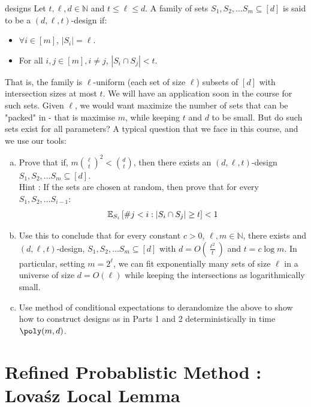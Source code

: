 \begin{exercise-prob}
\begin{show-ps2}{designs}
Let $t,\ell, d \in \mathbb{N}$ and $t \le \ell \le d$. 
A family of sets $S_1, S_2, \ldots S_m \subseteq [d]$ is said to be a $(d,\ell, t)$-design if: 
\begin{itemize}
\itemsep 0pt
\item $\forall i \in [m]$, $|S_i| = \ell$.
\item For all $i,j \in [m], i \ne j$, $|S_i \cap S_j| < t$.
\end{itemize}
That is, the family is $\ell$-uniform (each set of size $\ell$) subsets of $[d]$ with intersection sizes at most $t$. We will have an application soon in the course for such sets. Given $\ell$, we would want maximize the number of sets that can be "packed" in - that is maximise $m$, while keeping $t$ and $d$ to be small. But do such sets exist for all parameters? A typical question that we face in this course, and we use our tools:
\begin{enumerate}[(a)]
\item Prove that if, $m {\ell \choose t}^2 < {d \choose t}$, then there exists an $(d,\ell,t)$-design $S_1, S_2, \ldots S_m \subseteq [d]$. \\
Hint : If the sets are chosen at random, then prove that for every $S_1, S_2, \ldots S_{i-1}$:
$${\mathbb E}_{S_i}\left[\# j < i : |S_i \cap S_j| \ge t \right] < 1$$
\item Use this to conclude that for every constant $c > 0$, $\ell, m \in \mathbb{N}$, there exists and $(d,\ell,t)$-design, $S_1, S_2, \ldots S_m \subseteq [d]$ with $d = O\left( \frac{\ell^2}{t} \right)$ and $t = c\log m$. In particular, setting $m = 2^\ell$, we can fit exponentially many sets of size $\ell$ in a universe of size $d = O(\ell)$
while keeping the intersections as logarithmically small.
\item Use method of conditional expectations to derandomize the above to show how to construct designs as in Parts 1 and 2 deterministically in time $\poly(m,d)$.
\end{enumerate}
\end{show-ps2}
\end{exercise-prob}


\section{Refined Probablistic Method : Lova\'sz Local Lemma}

